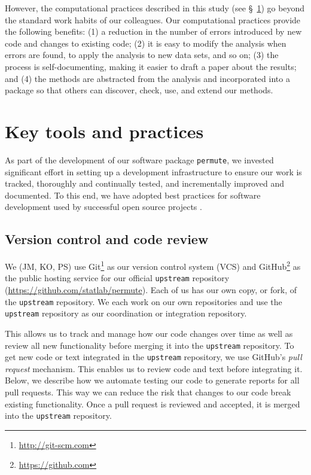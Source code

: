 \documentclass[]{article}
\begin{document}
However, the computational practices described in this study
(see \S~\ref{key-tools}) go beyond the standard work habits of our colleagues.
Our computational practices provide the following benefits:
(1) a reduction in the number of errors introduced by new code and changes to
    existing code;
(2) it is easy to modify the analysis when errors are found, to apply the
    analysis to new data sets, and so on;
(3) the process is self-documenting, making it easier to draft a paper about
    the results; and
(4) the methods are abstracted from the analysis and incorporated into a
    package so that others can discover, check, use, and extend our methods.

\section{Key tools and practices}\label{key-tools}

As part of the development of our software package \texttt{permute}, we
invested significant effort in setting up a development infrastructure to
ensure our work is tracked, thoroughly and continually tested, and
incrementally improved and documented.
To this end, we have adopted best practices for software development used by
successful open source projects \citep{millman2014developing}.

\subsection{Version control and code review}

We (JM, KO, PS) use Git\footnote{\url{http://git-scm.com}} as our version
control system (VCS) and GitHub\footnote{\url{https://github.com}} as the
public hosting service for our official \texttt{upstream} repository
(\url{https://github.com/statlab/permute}).
Each of us has our own copy, or fork, of the \texttt{upstream} repository.
We each work on our own repositories and use the \texttt{upstream} repository
as our coordination or integration repository.

This allows us to track and manage how our code changes over time as well as
review all new functionality before merging it into the \texttt{upstream}
repository.
To get new code or text integrated in the \texttt{upstream} repository, we use
GitHub's \emph{pull request} mechanism.
This enables us to review code and text before integrating it.
Below, we describe how we automate testing our code to generate reports for all
pull requests.
This way we can reduce the risk that changes to our code break existing
functionality.
Once a pull request is reviewed and accepted, it is merged into the
\texttt{upstream} repository.
\end{document}
